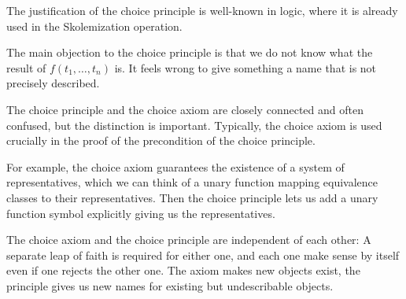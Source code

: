 The justification of the choice principle is well-known in logic, where it is already used in the Skolemization operation.

The main objection to the choice principle is that we do not know what the result of $f(t_1,\ldots,t_n)$ is. It feels wrong to give something a name that is not precisely described.

\begin{remark}
The choice principle and the choice axiom are closely connected and often confused, but the distinction is important. Typically, the choice axiom is used crucially in the proof of the precondition of the choice principle.

For example, the choice axiom guarantees the existence of a system of representatives, which we can think of a unary function mapping equivalence classes to their representatives. Then the choice principle lets us add a unary function symbol explicitly giving us the representatives.

The choice axiom and the choice principle are independent of each other: A separate leap of faith is required for either one, and each one make sense by itself even if one rejects the other one. The axiom makes new objects exist, the principle gives us new names for existing but undescribable objects.
\end{remark}
